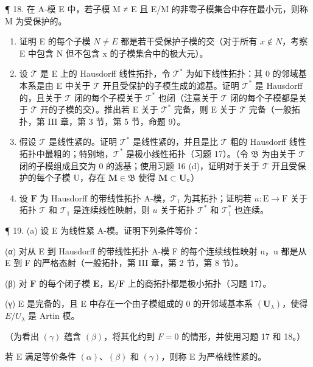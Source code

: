 ¶ 18. 在 A-模 E 中，若子模 M ≠ E 且 E/M 的非零子模集合中存在最小元，则称 M 为受保护的。

\begin{enumerate}
\def\labelenumi{(\alph{enumi})}
\item
  证明 E 的每个子模 \(N \neq E\) 都是若干受保护子模的交（对于所有 \(x \notin N\)，考察 E 中包含 N 但不包含 x 的子模集合中的极大元）。
\item
  设 \(\mathcal{T}\) 是 E 上的 Hausdorff 线性拓扑，令 \(\mathcal{T}^*\) 为如下线性拓扑：其 0 的邻域基本系是由 E 中关于 \(\mathcal{T}\) 开且受保护的子模生成的滤基。证明 \(\mathcal{T}^*\) 是 Hausdorff 的，且关于 \(\mathcal{T}\) 闭的每个子模关于 \(\mathcal{T}^*\) 也闭（注意关于 \(\mathcal{T}\) 闭的每个子模都是关于 \(\mathcal{T}\) 开的子模的交）。推出若 E 关于 \(\mathcal{T}^*\) 完备，则 E 关于 \(\mathcal{T}\) 完备（一般拓扑，第 III 章，第 3 节，第 5 节，命题 9）。
\item
  假设 \(\mathcal{T}\) 是线性紧的。证明 \(\mathcal{T}^*\) 是线性紧的，并且是比 \(\mathcal{T}\) 粗的 Hausdorff 线性拓扑中最粗的；特别地，\(\mathcal{T}^*\) 是极小线性拓扑（习题 17）。（令 \(\mathfrak{B}\) 为由关于 \(\mathcal{T}\) 闭的子模组成且交为 0 的滤基；使用习题 16 (d)，证明对于关于 \(\mathcal{T}\) 开且受保护的每个子模 U，存在 \(\mathbf{M} \in \mathfrak{B}\) 使得 \(\mathbf{M} \subset \mathbf{U}\)。）
\item
  设 \(\mathbf{F}\) 为 Hausdorff 的带线性拓扑 A-模，\(\mathcal{T}_1\) 为其拓扑；证明若 \(u: \mathrm{E} \to \mathrm{F}\) 关于拓扑 \(\mathcal{T}\) 和 \(\mathcal{T}_1\) 是连续线性映射，则 \(u\) 关于拓扑 \(\mathcal{T}^*\) 和 \(\mathcal{T}_1^*\) 也连续。
\end{enumerate}

¶ 19. (a) 设 E 为线性紧 A-模。证明下列条件等价：

(α) 对从 E 到 Hausdorff 的带线性拓扑 A-模 F 的每个连续线性映射 u，u 都是从 E 到 F 的严格态射（一般拓扑，第 III 章，第 2 节，第 8 节）。

(β) 对 \(\mathbf{F}\) 的每个闭子模 \(\mathbf{E}\)，\(\mathbf{E} / \mathbf{F}\) 上的商拓扑都是极小拓扑（习题 17）。

(γ) E 是完备的，且 E 中存在一个由子模组成的 0 的开邻域基本系 \((\mathbf{U}_{\lambda})\)，使得 \(E/U_{\lambda}\) 是 Artin 模。

（为看出 \((\gamma)\) 蕴含 \((\beta)\)，将其化约到 \(F = 0\) 的情形，并使用习题 17 和 18。）

若 E 满足等价条件 \((\alpha)\)、\((\beta)\) 和 \((\gamma)\)，则称 E 为严格线性紧的。

